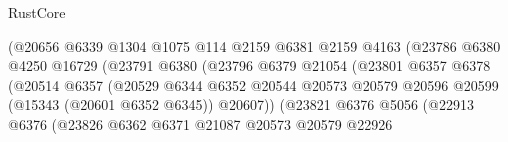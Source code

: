 \begin{lexlean}{RustCore}
\begin{coremodule}
                                          (@20656
                                            @6339
                                            @1304
                                            @1075
                                            @114
                                            @2159
                                            @6381
                                            @2159
                                            @4163
                                            (@23786
                                              @6380
                                              @4250
                                              @16729
                                              (@23791
                                                @6380
                                                (@23796
                                                  @6379
                                                  @21054
                                                  (@23801
                                                    @6357
                                                    @6378
                                                    (@20514
                                                      @6357
                                                      (@20529
                                                        @6344
                                                        @6352
                                                        @20544
                                                        @20573
                                                        @20579
                                                        @20596
                                                        @20599
                                                        (@15343 (@20601 @6352 @6345))
                                                        @20607))
                                                    (@23821
                                                      @6376
                                                      @5056
                                                      (@22913
                                                        @6376
                                                        (@23826
                                                          @6362
                                                          @6371
                                                          @21087
                                                          @20573
                                                          @20579
                                                          @22926

\end{coremodule}
\end{lexlean}
